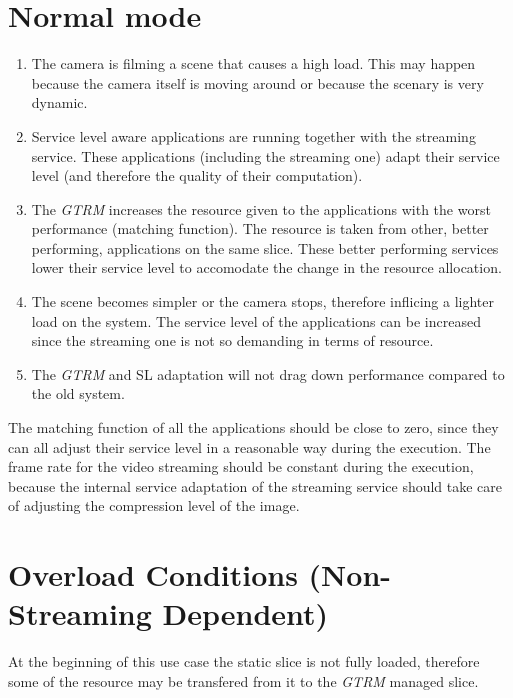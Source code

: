 \documentclass[nobiblatex]{LTHthesis}
\begin{document}
\section{Normal mode}
\begin{enumerate}
\item The camera is filming a scene that causes a high load. This may happen
  because the camera itself is moving around or because the scenary is
  very dynamic.
\item Service level aware applications are running together with the
  streaming service. These applications (including the streaming one) adapt
  their service level (and therefore the quality of their computation).
\item The \emph{GTRM} increases the resource given to the applications with the
  worst performance (matching function). The resource is taken from other,
  better performing, applications on the same slice. These better performing
  services lower their service level to accomodate the change in the resource
  allocation.
\item The scene becomes simpler or the camera stops, therefore inflicing
  a lighter load on the system. The service level of the applications can be
  increased since the streaming one is not so demanding in terms of resource.
\item The \emph{GTRM} and SL adaptation will not drag down performance compared to the old system.
\end{enumerate}

The matching function of all the applications should be close to zero, since
they can all adjust their service level in a reasonable way during the
execution. The frame rate for the video streaming should be constant during
the execution, because the internal service adaptation of the streaming
service should take care of adjusting the compression level of the image.

\section{Overload Conditions (Non-Streaming Dependent)}


At the beginning of this use case the static slice is not fully loaded,
therefore some of the resource may be transfered from it to the \emph{GTRM}
managed slice.
\end{document}
